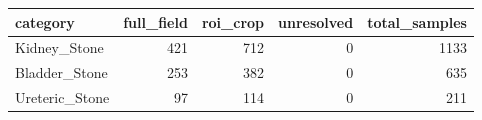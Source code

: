 \begin{tabular}{lrrrr}
\toprule
category & full_field & roi_crop & unresolved & total_samples \\
\midrule
Kidney_Stone & 421 & 712 & 0 & 1133 \\
Bladder_Stone & 253 & 382 & 0 & 635 \\
Ureteric_Stone & 97 & 114 & 0 & 211 \\
\bottomrule
\end{tabular}
